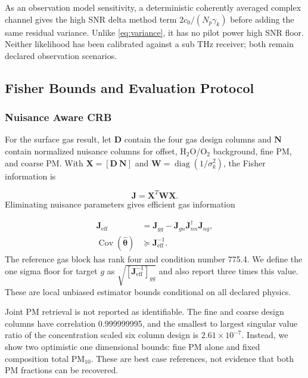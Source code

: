 \documentclass[conference]{IEEEtran}
\newcommand{\pmten}{PM$_{10}$}
\begin{document}
As an observation model sensitivity, a deterministic coherently averaged complex channel gives the high SNR delta method term $2c_0/(N_p\gamma_k)$ before adding the same residual variance. Unlike \eqref{eq:variance}, it has no pilot power high SNR floor. Neither likelihood has been calibrated against a sub THz receiver; both remain declared observation scenarios.

\subsection{Fisher Bounds and Evaluation Protocol}

\subsubsection{Nuisance Aware CRB}

For the surface gas result, let $\boldsymbol D$ contain the four gas design columns and $\boldsymbol N$ contain normalized nuisance columns for offset, H$_2$O/O$_2$ background, fine PM, and coarse PM. With $\boldsymbol X=[\boldsymbol D\ \boldsymbol N]$ and $\boldsymbol W=\operatorname{diag}(1/\sigma_k^2)$, the Fisher information is \cite{kay1993}

\begin{equation}
\boldsymbol J=\boldsymbol X^T\boldsymbol W\boldsymbol X.
\label{eq:fim}
\end{equation}
Eliminating nuisance parameters gives efficient gas information

\begin{equation}
\begin{aligned}
\boldsymbol J_{\mathrm{eff}}&=\boldsymbol J_{gg}
-\boldsymbol J_{gn}\boldsymbol J_{nn}^{\dagger}\boldsymbol J_{ng},\\
\operatorname{Cov}(\widehat{\boldsymbol\theta})&\succeq
\boldsymbol J_{\mathrm{eff}}^{-1}.
\end{aligned}
\label{eq:schur}
\end{equation}
The reference gas block has rank four and condition number 775.4. We define the one sigma floor for target $g$ as $\sqrt{[\boldsymbol J_{\mathrm{eff}}^{-1}]_{gg}}$ and also report three times this value. These are local unbiased estimator bounds conditional on all declared physics.

Joint PM retrieval is not reported as identifiable. The fine and coarse design columns have correlation 0.999999995, and the smallest to largest singular value ratio of the concentration scaled six column design is $2.61\times10^{-7}$. Instead, we show two optimistic one dimensional bounds: fine PM alone and fixed composition total \pmten. These are best case references, not evidence that both PM fractions can be recovered.
\end{document}
